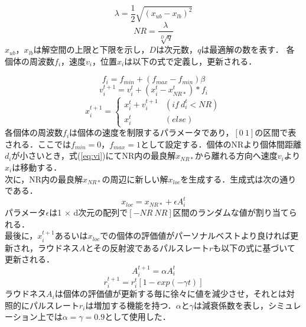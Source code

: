 \documentclass[twocolumn, a4paper]{UECIEresume}
\begin{document}
\begin{equation}
\label{eq:lambda}
\lambda =\frac{1}{2} \sqrt{(x_{ub}-x_{lb})^2}
\end{equation}
\begin{equation}
\label{eq:NR}
NR=\frac{\lambda}{\sqrt[D]{q}}
\end{equation}
$x_{ub}$，${x_{lb}}$は解空間の上限と下限を示し，${D}$は次元数，$q$は最適解の数を表す．
各個体の周波数${f_i}$，速度${v_i}$，位置${x_i}$は以下の式で定義し，更新される．

\begin{equation}
\label{eq:freq}
f_i=f_{min}+(f_{max}-f_{min}) \beta
\end{equation}
\begin{equation}
\label{eq:vi}
v_i^{t+1}=v_i^t+(x_i^t-x_{NR*}^t)*f_i
\end{equation}
\begin{equation}
\label{eq:xi}
x_i^{t+1}= \begin{cases}
x_i^t+v_i^{t+1} & (if \ d_i^t < NR) \\
x_i^t & (else)
\end{cases}
\end{equation}
各個体の周波数${f_i}$は個体の速度を制限するパラメータであり，$[0 \ 1]$の区間で表される．ここでは${f_{min}=0}$，${f_{max}=1}$として設定する．個体のNRより個体間距離${d_i}$が小さいとき，式(\ref{eq:vi})にてNR内の最良解${x_{NR*}}$から離れる方向へ速度${v_i}$より${x_i}$は移動する． \\
次に，NR内の最良解${x_{NR*}}$の周辺に新しい解${x_{loc}}$を生成する．生成式は次の通りである．
\begin{equation}
\label{eq:loc}
x_{loc}=x_{NR*} + \epsilon A_i^t
\end{equation}
パラメータ$\epsilon$は1 $\times$ d次元の配列で$[-NR \ NR]$区間のランダムな値が割り当てられる． \\
最後に，${x_i^{t+1}}$あるいは${x_{loc}}$での個体の評価値がパーソナルベストより良ければ更新され，ラウドネス$A$とその反射波であるパルスレート$r$も以下の式に基づいて更新される．
\begin{equation}
\label{eq:loud}
A_i^{t+1}= \alpha A_i^t
\end{equation}
\begin{equation}
\label{eq:pulse}
r_i^{t+1}=r_i^t[1-exp(- \gamma t)]
\end{equation}
ラウドネス$A_i$は個体の評価値が更新する毎に徐々に値を減少させ，それとは対照的にパルスレート$r_i$は増加する機能を持つ．$\alpha$と$\gamma$は減衰係数を表し，シミュレーション上では$\alpha = \gamma = 0.9$として使用した．
\end{document}
